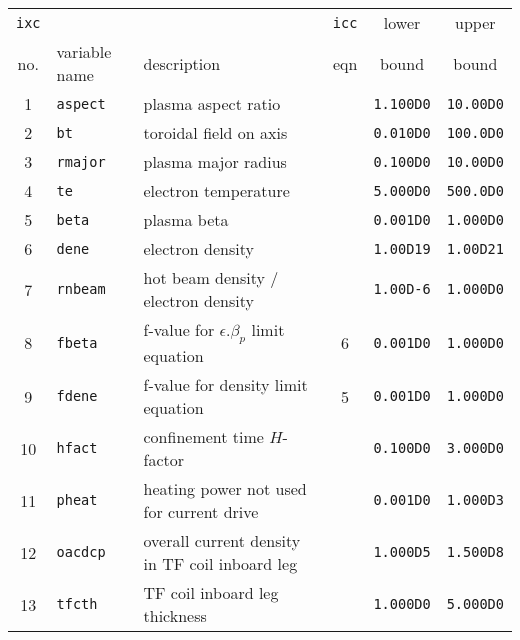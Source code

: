 \documentclass[11pt,a4paper]{report}
\begin{document}
\begin{table}[tbph]
\footnotesize
\begin{center}

\begin{tabular}{||c|l|l|c|c|c||} \hline
\texttt{ixc} &          &                                               & \texttt{icc} & lower        & upper       \\
no. & variable name     & description                                   & eqn & bound        & bound       \\ \hline
1   & \texttt{aspect}   & plasma aspect ratio                           &     & \texttt{1.100D0} & \texttt{10.00D0} \\
2   & \texttt{bt}       & toroidal field on axis                        &     & \texttt{0.010D0} & \texttt{100.0D0} \\
3   & \texttt{rmajor}   & plasma major radius                           &     & \texttt{0.100D0} & \texttt{10.00D0} \\
4   & \texttt{te}       & electron temperature                          &     & \texttt{5.000D0} & \texttt{500.0D0} \\
5   & \texttt{beta}     & plasma beta                                   &     & \texttt{0.001D0} & \texttt{1.000D0} \\
6   & \texttt{dene}     & electron density                              &     & \texttt{1.00D19} & \texttt{1.00D21} \\
7   & \texttt{rnbeam}   & hot beam density / electron density           &     & \texttt{1.00D-6} & \texttt{1.000D0} \\
8   & \texttt{fbeta}    & f-value for $\epsilon.\beta_p$ limit equation & 6   & \texttt{0.001D0} & \texttt{1.000D0} \\
9   & \texttt{fdene}    & f-value for density limit equation            & 5   & \texttt{0.001D0} & \texttt{1.000D0} \\
10  & \texttt{hfact}    & confinement time $H$-factor                   &     & \texttt{0.100D0} & \texttt{3.000D0} \\
11  & \texttt{pheat}    & heating power not used for current drive      &     & \texttt{0.001D0} & \texttt{1.000D3} \\
12  & \texttt{oacdcp}   & overall current density in TF coil inboard leg&     & \texttt{1.000D5} & \texttt{1.500D8} \\
13  & \texttt{tfcth}    & TF coil inboard leg thickness                 &     & \texttt{1.000D0} & \texttt{5.000D0} \\

\end{tabular}
\end{center}
\end{table}
\end{document}
